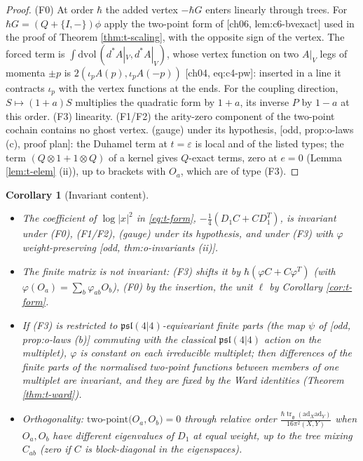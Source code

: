 \documentclass[11pt]{report}
\theoremstyle{plain}
\newtheorem{corollary}[theorem]{Corollary}
\theoremstyle{definition}
\numberwithin{equation}{chapter}
\newcommand{\unit}{\tfrac{\hbar\operatorname{tr}_{\mathfrak g}(\mathrm{ad}_X\mathrm{ad}_Y)}{16\pi^2(X,Y)}}
\newcommand{\TP}[2]{\mathrm{two\mbox{-}point}\big(#1,#2\big)}
\begin{document}
\begin{proof}
(F0) At order $\hbar$ the added vertex $-\hbar G$ enters linearly through trees. For $\hbar G=(Q+\{I,-\})\phi$ apply the two-point form of [ch06, lem:c6-bvexact] used in the proof of Theorem \ref{thm:t-scaling}, with the opposite sign of the vertex. The forced term is $\int\mathrm{dvol}\,(d^*A|_V,d^*A|_V)$, whose vertex function on two $A|_V$ legs of momenta $\pm p$ is $2(\iota_pA(p),\iota_pA(-p))$ [ch04, eq:c4-pw]: inserted in a line it contracts $\iota_p$ with the vertex functions at the ends. For the coupling direction, $S\mapsto(1+a)S$ multiplies the quadratic form by $1+a$, its inverse $P$ by $1-a$ at this order. (F3) linearity. (F1/F2) the arity-zero component of the two-point cochain contains no ghost vertex. (gauge) under its hypothesis, [odd, prop:o-laws (c), proof plan]: the Duhamel term at $t=\varepsilon$ is local and of the listed types; the term $(Q\otimes1+1\otimes Q)$ of a kernel gives $Q$-exact terms, zero at $e=0$ (Lemma \ref{lem:t-elem} (ii)), up to brackets with $O_a$, which are of type (F3).
\end{proof}

\begin{corollary}[Invariant content]
\label{cor:t-inv}
\begin{itemize}
\item[(i)] The coefficient of $\log|x|^2$ in \eqref{eq:t-form}, $-\tfrac14(D_1C+CD_1^T)$, is invariant under (F0), (F1/F2), (gauge) under its hypothesis, and under (F3) with $\varphi$ weight-preserving [odd, thm:o-invariants (ii)].
\item[(ii)] The finite matrix is not invariant: (F3) shifts it by $\hbar(\varphi C+C\varphi^T)$ (with $\varphi(O_a)=\sum_b\varphi_{ab}O_b$), (F0) by the insertion, the unit $\ell$ by Corollary \ref{cor:t-form}.
\item[(iii)] If (F3) is restricted to $\mathfrak{psl}(4|4)$-equivariant finite parts (the map $\psi$ of [odd, prop:o-laws (b)] commuting with the classical $\mathfrak{psl}(4|4)$ action on the multiplet), $\varphi$ is constant on each irreducible multiplet; then differences of the finite parts of the normalised two-point functions between members of one multiplet are invariant, and they are fixed by the Ward identities (Theorem \ref{thm:t-ward}).
\item[(iv)] Orthogonality: $\TP{O_a}{O_b}=0$ through relative order $\unit$ when $O_a,O_b$ have different eigenvalues of $D_1$ at equal weight, up to the tree mixing $C_{ab}$ (zero if $C$ is block-diagonal in the eigenspaces).
\end{itemize}
\end{corollary}
\end{document}
